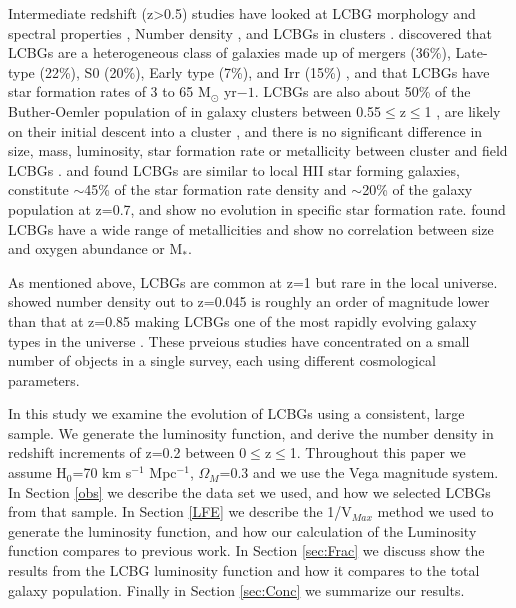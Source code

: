 \documentclass[manuscript]{aastex61}
\begin{document}
Intermediate redshift (z>0.5) studies have looked at LCBG morphology \citep{2007A&A...469..483R} and spectral properties \citep{2010ApJ...708.1076T}, Number density \citep{1997ApJ...489..559G,1997ApJ...489..543P}, and LCBGs in clusters \citep{2006ApJ...636L..13C,2014ApJ...786...30C,2016ApJ...817...87C}. \citep{2007A&A...469..483R} discovered that LCBGs are a heterogeneous class of galaxies made up of mergers (36\%), Late-type (22\%), S0 (20\%), Early type (7\%), and Irr (15\%) , and that LCBGs have star formation rates of 3 to 65 M$_{\odot}$ yr${-1}$. LCBGs are also about 50\% of the Buther-Oemler population of in galaxy clusters between 0.55$\leq$z$\leq$1 \citep{2006ApJ...636L..13C}, are likely on their initial descent into a cluster \citep{2014ApJ...786...30C}, and there is no significant difference in size, mass, luminosity, star formation rate or metallicity between cluster and field LCBGs \citep{2016ApJ...817...87C}. \citep{1997ApJ...489..559G} and \citet{1997ApJ...489..543P} found LCBGs are similar to local HII star forming galaxies, constitute $\sim$45\% of the star formation rate density and $\sim$20\% of the galaxy population at z=0.7, and show no evolution in specific star formation rate. \citep{2010ApJ...708.1076T} found LCBGs have a wide range of metallicities and show no correlation between size and oxygen abundance or M$_{*}$.        

As mentioned above, LCBGs are common at z=1 but rare in the local universe. \citet{2004ApJ...617.1004W} showed number density out to z=0.045 is roughly an order of magnitude lower than that at z=0.85 \citep{1997ApJ...489..543P} making LCBGs one of the most rapidly evolving galaxy types in the universe \citep{2007A&A...469..483R}. These prveious studies have concentrated on a small number of objects in a single survey, each using different cosmological parameters. 

In this study we examine the evolution of LCBGs using a consistent, large sample. We generate the luminosity function, and derive the number density in redshift increments of z=0.2 between 0$\leq$z$\leq$1. Throughout this paper we assume H$_{0}$=70 km s$^{-1}$ Mpc$^{-1}$, $\Omega_{M}$=0.3 and we use the Vega magnitude system. In Section \ref{obs} we describe the data set we used, and how we selected LCBGs from that sample. In Section \ref{LFE} we describe the 1/V$_{Max}$ method we used to generate the luminosity function, and how our calculation of the Luminosity function compares to previous work. In Section \ref{sec:Frac} we discuss show the results from the LCBG luminosity function and how it compares to the total galaxy population. Finally in Section \ref{sec:Conc} we summarize our results. 
\end{document}

